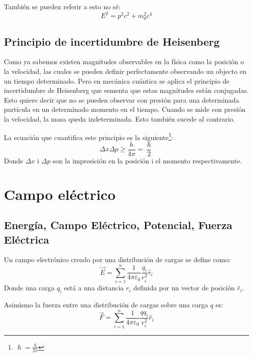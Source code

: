 \documentclass[arial,a4paper,print]{article}
\begin{document}
También se pueden referir a esto no sé:
\begin{equation*}
	E^{2} = p^{2}c^{2} + m_{0}^{2}c^{4}
\end{equation*}

\subsection{Principio de incertidumbre de Heisenberg}
Como ya sabemos existen magnitudes observables en la física como la posición o la velocidad, las cuales se pueden definir perfectamente observando un objecto en un tiempo determinado. Pero en mecánica cuántica se aplica el principio de incertidumbre de Heisenberg que esmenta que estas magnitudes están conjugadas. Esto quiere decir que no se pueden observar con presión para una determinada partícula en un determinado momento en el tiempo. Cuando se mide con presión la velocidad, la masa queda indeterminada. Esto también sucede al contrario. 

La ecuación que cuantifica este principio es la siguiente\footnote{$\hslash = \frac{h}{2\pi}$}:
\begin{equation*}
	\Delta x\Delta p \geq \frac{h}{4\pi} = \frac{\hslash}{2}
\end{equation*}
Donde $\Delta x$ i $\Delta p$ son la impresición en la posición i el momento respectivamente.

\pagebreak
\section{Campo eléctrico}

\subsection{Energía, Campo Eléctrico, Potencial, Fuerza Eléctrica}
Un campo electrónico creado por una distribución de cargas se define como:
\begin{equation*}
	\vec{E} = \sum^{n}_{i=1}\frac{1}{4\pi\varepsilon_{0}}\frac{q_{i}}{r^{2}_{i}}\hat{r}_{i}
\end{equation*} 
Donde una carga $q_{i}$ está a una distancia $r_{i}$ definida por un vector de posición $\hat{r}_{i}$.

Asimismo la fuerza entre una distribución de cargas sobre una carga $q$ es:
\begin{equation*}
	\vec{F} = \sum_{i=1}^{n}\frac{1}{4\pi\varepsilon_{0}}\frac{qq_{i}}{r^{2}_{i}}\hat{r}_{i}
\end{equation*}
\end{document}
